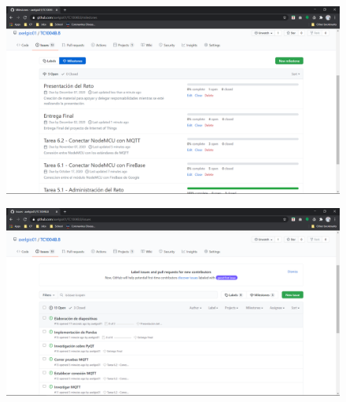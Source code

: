 \documentclass[12pt]{article}
\begin{document}
\begin{figure}[!h]
\centering
\includegraphics[width = \textwidth]{repo_Milestones}
\end{figure}

\newpage

\begin{figure}[!h]
\centering
\includegraphics[width = \textwidth]{repo_Issues}
\end{figure}
\end{document}
